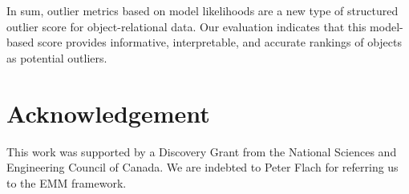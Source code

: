 \documentclass[conference]{IEEEtran}
\begin{document}
								
								In sum, outlier metrics based on model likelihoods are a new type of structured outlier score for object-relational data.  Our evaluation indicates that this model-based score provides informative, interpretable, and accurate rankings of objects as potential outliers. 
								
				\section*{Acknowledgement}
This work was supported by a Discovery Grant from the National Sciences and Engineering Council of Canada. We are indebted to Peter Flach for referring us to the EMM framework.		
								
								
								
								
							
\end{document}
